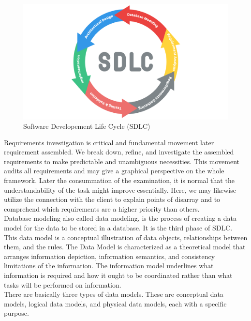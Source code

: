\begin{figure}[H]
    \centering
    \includegraphics[width=1\textwidth]{images/sdlc}
    \caption{Software Developement Life Cycle (SDLC)}
    \label{fig:sdlc}
\end{figure}

Requirements investigation is critical and fundamental movement later requirement assembled. We break down, refine, and investigate the assembled requirements to make predictable and unambiguous necessities. This movement audits all requirements and may give a graphical perspective on the whole framework. Later the consummation of the examination, it is normal that the understandability of the task might improve essentially. Here, we may likewise utilize the connection with the client to explain points of disarray and to comprehend which requirements are a higher priority than others.\\

Database modeling also called data modeling, is the process of creating a data model for the data to be stored in a database.  It is the third phase of SDLC. This data model is a conceptual illustration of data objects, relationships between them, and the rules.  The Data Model is characterized as a theoretical model that arranges information depiction, information semantics, and consistency limitations of the information. The information model underlines what information is required and how it ought to be coordinated rather than what tasks will be performed on information.\\

There are basically three types of data models. These are conceptual data models, logical data models, and physical data models,  each with a specific purpose.\\

